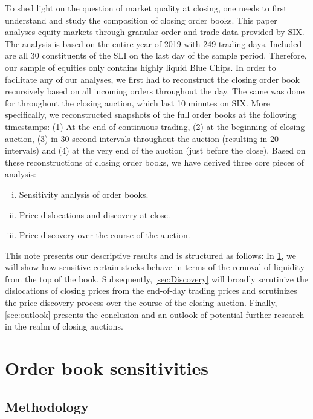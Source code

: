 \documentclass[11pt,a4paper, notitlepage]{article}
\begin{document}
	To shed light on the question of market quality at closing, one needs to first understand and study the composition of closing order books. This paper analyses equity markets through granular order and trade data provided by \acf{SIX}. The analysis is based on the entire year of 2019 with 249 trading days. Included are all 30 constituents of the \ac{SLI} on the last day of the sample period. Therefore, our sample of equities only contains highly liquid Blue Chips. In order to facilitate any of our analyses, we first had to reconstruct the closing order book recursively based on all incoming orders throughout the day. The same was done for throughout the closing auction, which last 10 minutes on \acf{SIX}. More specifically, we reconstructed snapshots of the full order books at the following timestamps: (1) At the end of continuous trading, (2) at the beginning of closing auction, (3) in 30 second intervals throughout the auction (resulting in 20 intervals) and (4) at the very end of the auction (just before the close). Based on these reconstructions of closing order books, we have derived three core pieces of analysis:
	\begin{enumerate}[(i)]
		\item Sensitivity analysis of order books.
		\item Price dislocations and discovery at close.
		\item Price discovery over the course of the auction.
	\end{enumerate}
	
	This note presents our descriptive results and is structured as follows: In \cref{sec:sensitivities}, we will show how sensitive certain stocks behave in terms of the removal of liquidity from the top of the book. Subsequently, \cref{sec:Discovery} will broadly scrutinize the dislocations of closing prices from the end-of-day trading prices and scrutinizes the price discovery process over the course of the closing auction. Finally, \cref{sec:outlook} presents the conclusion and an outlook of potential further research in the realm of closing auctions.
	
	
	\section{Order book sensitivities} \label{sec:sensitivities}
	
	\subsection{Methodology}\label{subsec:methodology}
	
\end{document}
